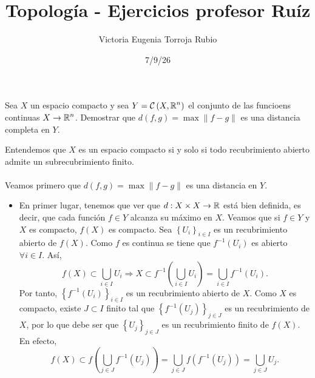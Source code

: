 \documentclass{article}
\begin{document}
\title{Topología - Ejercicios profesor Ruíz}
\author{Victoria Eugenia Torroja Rubio}
\date{7/9/26}

\maketitle

\begin{ej}[Número 0.8]
Sea $\displaystyle X $ un espacio compacto y sea $\displaystyle Y = \mathcal{C}\left(X, \mathbb{R}^{n}\right) $ el conjunto de las funcioens continuas $\displaystyle X \to \mathbb{R}^{n} $. Demostrar que $\displaystyle d\left(f,g\right)=\max \|f-g\| $ es una distancia completa en $\displaystyle Y $.
\end{ej}

\begin{sol}
Entendemos que $\displaystyle X $ es un espacio compacto si y solo si todo recubrimiento abierto admite un subrecubrimiento finito. \\ \\
Veamos primero que $\displaystyle d\left(f,g\right)=\max \|f-g\| $ es una distancia en $\displaystyle Y $.
\begin{itemize}
	\item En primer lugar, tenemos que ver que $\displaystyle d : X \times X \to \mathbb{R} $ está bien definida, es decir, que cada función $\displaystyle f \in Y $ alcanza su máximo en $\displaystyle X $. Veamos que si $\displaystyle f\in Y $ y $\displaystyle X $ es compacto, $\displaystyle f\left(X\right) $ es compacto. Sea $\displaystyle \left\{ U_{i}\right\} _{i \in I} $ es un recubrimiento abierto de $\displaystyle f\left(X\right) $. Como $\displaystyle f $ es continua se tiene que $\displaystyle f^{-1}\left(U_{i}\right) $ es abierto $\displaystyle \forall i \in I $. Así, 
		\[f\left(X\right)\subset \bigcup_{i \in I}U_{i} \Rightarrow X \subset f^{-1}\left(\bigcup_{i \in I}U_{i}\right)=\bigcup_{i \in I}f^{-1}\left(U_{i}\right) .\]
		Por tanto, $\displaystyle \left\{ f^{-1}\left(U_{i}\right)\right\} _{i \in I} $ es un recubrimiento abierto de $\displaystyle X $. Como $\displaystyle X $ es compacto, existe $\displaystyle J \subset I $ finito tal que $\displaystyle \left\{ f^{-1}\left(U_{j}\right)\right\} _{j\in J} $ es un recubrimiento de $\displaystyle X $, por lo que debe ser que $\displaystyle \left\{ U_{j}\right\} _{j \in J} $ es un recubrimiento finito de $\displaystyle f\left(X\right) $. En efecto,
		\[f\left(X\right) \subset f\left(\bigcup_{j \in J}f^{-1}\left(U_{j}\right)\right)=\bigcup_{j \in J}f\left(f^{-1}\left(U_{j}\right)\right)=\bigcup_{j \in J}U_{j} .\]

\end{itemize}
\end{sol}
\end{document}
